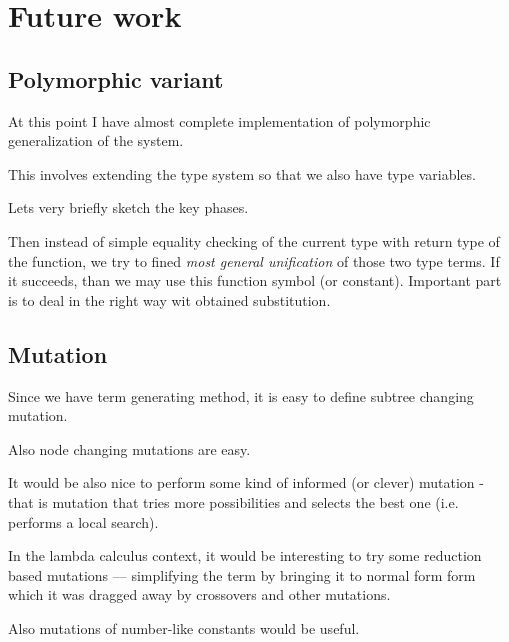 \documentclass[12pt,a4paper]{report}
\newenvironment{todo}
{ ~\\[0.5em]
  {\color{red}\textbf{TODO}}
  \begin{easylist}[itemize]}
{ \end{easylist}
  ~}
\begin{document}
\chapter{Future work}

\section{Polymorphic variant}

At this point I have almost complete implementation
of polymorphic generalization of the system.

This involves extending the type system so that we
also have type variables.

Lets very briefly sketch the key phases.

Then instead of simple equality checking of the
current type with return type of the function, we 
try to fined \textit{most general unification}
of those two type terms. If it succeeds, than 
we may use this function symbol (or constant).
Important part is to deal in the right way wit obtained 
substitution. 


\section{Mutation}

Since we have term generating method, it is easy to 
define subtree changing mutation. 

Also node changing mutations are easy.

It would be also nice to perform some kind of informed
(or clever) mutation  - that is mutation that tries more possibilities 
and selects the best one (i.e. performs a local search).

In the lambda calculus context, it would be interesting to try 
some reduction based mutations --- simplifying the term
by bringing it to normal form form which it was dragged 
away by crossovers and other mutations.

Also mutations of number-like constants would be useful. 
\end{document}

